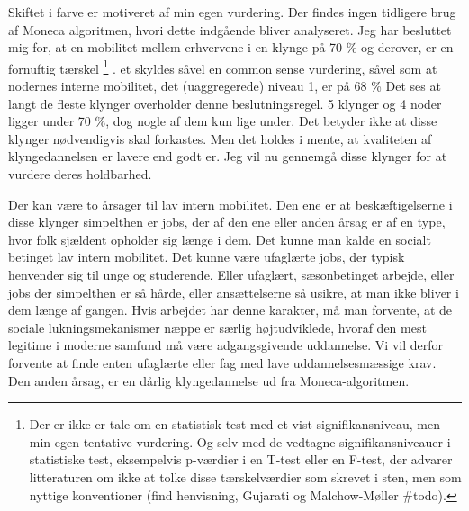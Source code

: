 Skiftet i farve er motiveret af min egen vurdering. Der findes ingen tidligere brug af Moneca algoritmen, hvori dette indgående bliver analyseret. Jeg har besluttet mig for, at en mobilitet mellem erhvervene i en klynge på 70 \% og derover, er en fornuftig tærskel%
%
\footnote{Der er ikke er tale om en statistisk test med et vist signifikansniveau, men min egen tentative vurdering. Og selv med de vedtagne signifikansniveauer i statistiske test, eksempelvis p-værdier i en T-test eller en F-test,  der advarer litteraturen om ikke at tolke disse tærskelværdier som skrevet i sten, men som nyttige konventioner (find henvisning, Gujarati og Malchow-Møller \#todo). }%
%
. et skyldes såvel en common sense vurdering, såvel som at nodernes interne mobilitet, det (uaggregerede) niveau 1, er på 68 \%  Det ses at langt de fleste klynger overholder denne beslutningsregel. 5 klynger og 4 noder ligger under 70 \%, dog nogle af dem kun lige under. Det betyder ikke at disse klynger nødvendigvis skal forkastes. Men det holdes i mente, at kvaliteten af klyngedannelsen er lavere end godt er. Jeg vil nu gennemgå disse klynger for at vurdere deres holdbarhed.  

Der kan være to årsager til lav intern mobilitet. Den ene er at beskæftigelserne i disse klynger simpelthen er jobs, der af den ene eller anden årsag er af en type, hvor folk sjældent opholder sig længe i dem. Det kunne man kalde en socialt betinget lav intern mobilitet. Det kunne være ufaglærte jobs, der typisk henvender sig til unge og studerende. Eller ufaglært, sæsonbetinget arbejde, eller jobs der simpelthen er så hårde, eller ansættelserne så usikre, at man ikke bliver i dem længe af gangen. Hvis arbejdet har denne karakter, må man forvente, at de sociale lukningsmekanismer næppe er særlig højtudviklede, hvoraf den mest legitime i moderne samfund må være adgangsgivende uddannelse. Vi vil derfor forvente at finde enten ufaglærte eller fag med lave uddannelsesmæssige krav. Den anden årsag, er en dårlig klyngedannelse ud fra Moneca-algoritmen. 

